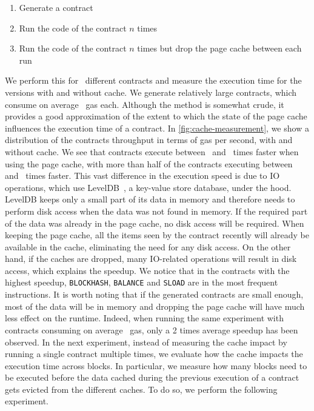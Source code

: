 \begin{enumerate}
  \item Generate a contract
  \item Run the code of the contract $n$ times
  \item Run the code of the contract $n$ times but drop the page cache between each run
\end{enumerate}
%
We perform this for~ different contracts and measure the execution time for the versions with and without cache. We generate relatively large contracts, which consume on average~ gas each.
Although the method is somewhat crude, it provides a good approximation of the extent to which the state of the page cache influences the execution time of a contract.
In \autoref{fig:cache-measurement}, we show a distribution of the contracts throughput in terms of gas per second, with and without cache. We see that contracts execute between~ and~ times faster when using the page cache, with more than half of the contracts executing between~ and~ times faster.
This vast difference in the execution speed is due to IO operations, which use LevelDB~\cite{ghemawat2011leveldb}, a key-value store database, under the hood. LevelDB keeps only a small part of its data in memory and therefore needs to perform disk access when the data was not found in memory.
If the required part of the data was already in the page cache, no disk access will be required.
When keeping the page cache, all the items seen by the contract recently will already be available in the cache, eliminating the need for any disk access. On the other hand, if the caches are dropped, many IO-related operations will result in disk access, which explains the speedup.
We notice that in the contracts with the highest speedup, \lstinline{BLOCKHASH}, \lstinline{BALANCE} and \lstinline{SLOAD} are in the most frequent instructions.
It is worth noting that if the generated contracts are small enough, most of the data will be in memory and dropping the page cache will have much less effect on the runtime.
Indeed, when running the same experiment with contracts consuming on average~ gas, only a 2 times average speedup has been observed.
%
 In the next experiment, instead of measuring the cache impact by running a single contract multiple times, we evaluate how the cache impacts the execution time across blocks. In particular, we measure how many blocks need to be executed before the data cached during the previous execution of a contract gets evicted from the different caches. To do so, we perform the following experiment.


